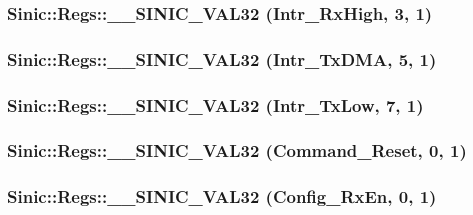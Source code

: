 \label{namespaceSinic_1_1Regs_a15c8e7a88ff5037b52606fad41516ae2}
\hypertarget{namespaceSinic_1_1Regs_a9eaf21ebdcaa54b7677e848153e9a98d}{
\subsubsection[{\_\-\_\-SINIC\_\-VAL32}]{\setlength{\rightskip}{0pt plus 5cm}Sinic::Regs::\_\-\_\-SINIC\_\-VAL32 (Intr\_\-RxHigh, \/  3, \/  1)}}
\label{namespaceSinic_1_1Regs_a9eaf21ebdcaa54b7677e848153e9a98d}
\hypertarget{namespaceSinic_1_1Regs_a592ae159611d8add61271ab85a94f4bb}{
\subsubsection[{\_\-\_\-SINIC\_\-VAL32}]{\setlength{\rightskip}{0pt plus 5cm}Sinic::Regs::\_\-\_\-SINIC\_\-VAL32 (Intr\_\-TxDMA, \/  5, \/  1)}}
\label{namespaceSinic_1_1Regs_a592ae159611d8add61271ab85a94f4bb}
\hypertarget{namespaceSinic_1_1Regs_ab74c21c9aae513bd929456c949a072b7}{
\subsubsection[{\_\-\_\-SINIC\_\-VAL32}]{\setlength{\rightskip}{0pt plus 5cm}Sinic::Regs::\_\-\_\-SINIC\_\-VAL32 (Intr\_\-TxLow, \/  7, \/  1)}}
\label{namespaceSinic_1_1Regs_ab74c21c9aae513bd929456c949a072b7}
\hypertarget{namespaceSinic_1_1Regs_a092b9fc5be50a4046607e619a74bebd3}{
\subsubsection[{\_\-\_\-SINIC\_\-VAL32}]{\setlength{\rightskip}{0pt plus 5cm}Sinic::Regs::\_\-\_\-SINIC\_\-VAL32 (Command\_\-Reset, \/  0, \/  1)}}
\label{namespaceSinic_1_1Regs_a092b9fc5be50a4046607e619a74bebd3}
\hypertarget{namespaceSinic_1_1Regs_aa64e553e52828eeabd7a0f7a34df493a}{
\subsubsection[{\_\-\_\-SINIC\_\-VAL32}]{\setlength{\rightskip}{0pt plus 5cm}Sinic::Regs::\_\-\_\-SINIC\_\-VAL32 (Config\_\-RxEn, \/  0, \/  1)}}
